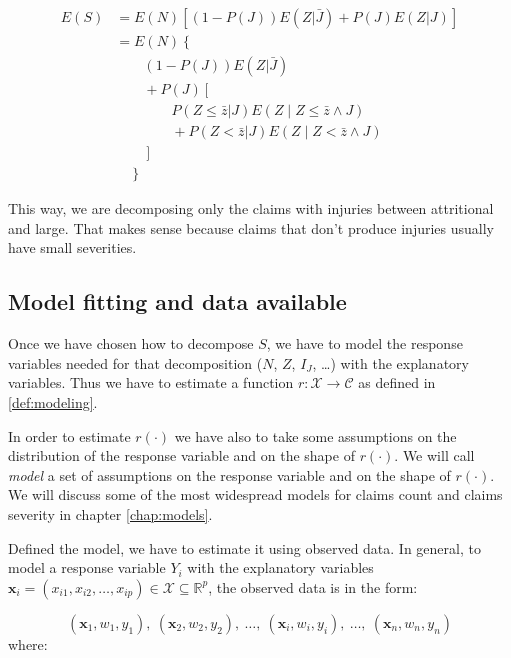 \documentclass[a4paper, nobind]{templates/ociamthesis}
\theoremstyle{definition}
\theoremstyle{definition}
\theoremstyle{definition}
\theoremstyle{remark}
\begin{document}
\begin{align*}
E(S) & = E(N) \left[\left( 1 - P(J) \right) E(Z|\bar{J}) + P(J) E(Z|J) \right] \\[11pt]
  & = E(N) \left\{ \right. \\
  & \qquad \left( 1 - P(J) \right) E(Z|\bar{J}) \\
  & \qquad + P(J) \left[ \right. \\
  & \qquad \qquad P(Z \le \bar{z} | J) E\left( Z \mid Z\le \bar{z} \land J \right) \\
  & \qquad \qquad + P(Z < \bar{z} | J) E\left( Z \mid Z < \bar{z} \land J \right) \\
  & \qquad \left. \right] \\
  & \quad \left. \right\}
\end{align*}

This way, we are decomposing only the claims with injuries between attritional and large. That makes sense because claims that don't produce injuries usually have small severities.

\hypertarget{model-fitting-and-data-available}{%
\subsection{Model fitting and data available}\label{model-fitting-and-data-available}}

Once we have chosen how to decompose \(S\), we have to model the response variables needed for that decomposition (\(N\), \(Z\), \(I_J\), \ldots) with the explanatory variables. Thus we have to estimate a function \(r:\mathcal{X}\rightarrow \mathcal{C}\) as defined in \ref{def:modeling}.

In order to estimate \(r(\cdot)\) we have also to take some assumptions on the distribution of the response variable and on the shape of \(r(\cdot)\). We will call \emph{model} a set of assumptions on the response variable and on the shape of \(r(\cdot)\). We will discuss some of the most widespread models for claims count and claims severity in chapter \ref{chap:models}.

Defined the model, we have to estimate it using observed data. In general, to model a response variable \(Y_i\) with the explanatory variables \(\boldsymbol{x}_i=(x_{i1}, x_{i2}, \dots, x_{ip})\in \mathcal{X} \subseteq \mathbb{R}^p\), the observed data is in the form:

\[
(\boldsymbol{x}_1, w_1, y_1), \ (\boldsymbol{x}_2, w_2, y_2), \ \dots, \ (\boldsymbol{x}_i, w_i, y_i), \ \dots, \ (\boldsymbol{x}_n, w_n, y_n)
\]
where:
\end{document}
